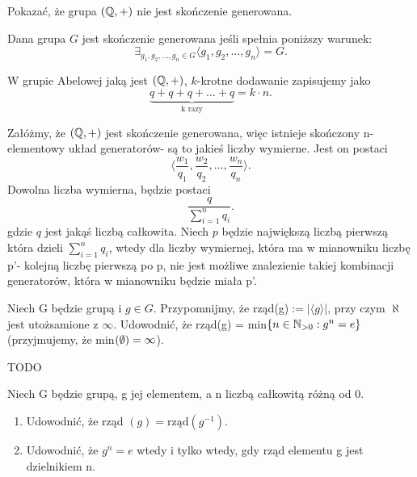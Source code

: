 \begin{problem}[6]
	
	Pokazać, że grupa $\left( \mathbb{Q}, + \right)$ nie jest skończenie generowana.
\end{problem}
\begin{solution}

	Dana grupa $G$ jest skończenie generowana jeśli spełnia poniższy warunek:
	\[
		\exists_{g_1,g_2,\ldots,g_{n} \in G} \langle g_1,g_2,\ldots,g_{n} \rangle = G   
	.\] 

	\begin{remark}
	
		W grupie Abelowej jaką jest $\left( \mathbb{Q}, + \right) $, $k$-krotne dodawanie zapisujemy jako
		 \[
			 \underbrace{q + q + q + \ldots + q}_{\text{k razy}} = k \cdot n
		.\] 
	\end{remark}	

	Załóżmy, że $\left( \mathbb{Q}, + \right) $ jest skończenie generowana, więc istnieje skończony n-elementowy układ generatorów- są to jakieś liczby wymierne. Jest on postaci \[
	\langle \frac{w_1}{q_1}, \frac{w_2}{q_2},\ldots, \frac{w_{n}}{q_{n}} \rangle 
	.\] 
	Dowolna liczba wymierna, będzie postaci \[
	\frac{q}{\sum_{i=1}^{n} q_{i}}
	.\] 
	gdzie $q$ jest jakąś liczbą całkowita. Niech $p$ będzie największą liczbą pierwszą która dzieli  $\sum_{i=1}^{n} q_i$, wtedy dla liczby wymiernej, która ma w mianowniku liczbę p'- kolejną liczbę pierwszą po p, nie jest możliwe znalezienie takiej kombinacji generatorów, która w mianowniku będzie miała p'.
\end{solution}
\begin{problem}[7]

	Niech G będzie grupą i $g\in G$. Przypomnijmy, że rząd(g)$ := |\langle g \rangle| $, przy czym $\aleph$ jest utożsamione z  $\infty$. Udowodnić, że rząd(g) = min$\{n \in \mathbb{N}_{>0} : g^{n} = e\}$ (przyjmujemy, że min$\left( \emptyset \right) = \infty$). 
\end{problem}
\begin{solution}

	TODO		
\end{solution}
\begin{problem}[8]	

	Niech G będzie grupą, g jej elementem, a n liczbą całkowitą różną od 0.
	\begin{enumerate}[label=\alph*)]
		\item Udowodnić, że rząd $\left( g \right) = \text{rząd}\left( g^{-1} \right)$.
		\item Udowodnić, że $g^{n} = e$ wtedy i tylko wtedy, gdy rząd elementu g jest dzielnikiem n.
	\end{enumerate}
\end{problem}
